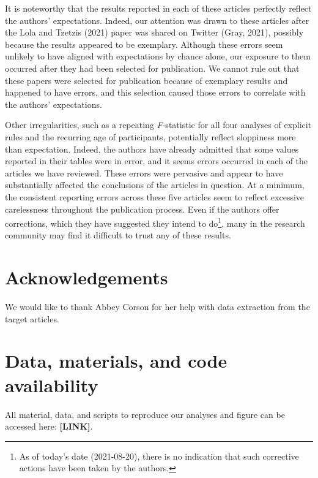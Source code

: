 \documentclass[
  english,
  man,floatsintext]{apa7}
\begin{document}
It is noteworthy that the results reported in each of these articles perfectly reflect the authors' expectations. Indeed, our attention was drawn to these articles after the Lola and Tzetzis (2021) paper was shared on Twitter (Gray, 2021), possibly because the results appeared to be exemplary. Although these errors seem unlikely to have aligned with expectations by chance alone, our exposure to them occurred after they had been selected for publication. We cannot rule out that these papers were selected for publication because of exemplary results and happened to have errors, and this selection caused those errors to correlate with the authors' expectations.

Other irregularities, such as a repeating \emph{F}-statistic for all four analyses of explicit rules and the recurring age of participants, potentially reflect sloppiness more than expectation. Indeed, the authors have already admitted that some values reported in their tables were in error, and it seems errors occurred in each of the articles we have reviewed. These errors were pervasive and appear to have substantially affected the conclusions of the articles in question. At a minimum, the consistent reporting errors across these five articles seem to reflect excessive carelessness throughout the publication process. Even if the authors offer corrections, which they have suggested they intend to do\footnote{As of today's date (2021-08-20), there is no indication that such corrective actions have been taken by the authors.}, many in the research community may find it difficult to trust any of these results.

\hypertarget{acknowledgements}{%
\section{Acknowledgements}\label{acknowledgements}}

We would like to thank Abbey Corson for her help with data extraction from the target articles.

\hypertarget{data-materials-and-code-availability}{%
\section{Data, materials, and code availability}\label{data-materials-and-code-availability}}

\label{sec:sharing} All material, data, and scripts to reproduce our analyses and figure can be accessed here: \textbf{{[}LINK{]}}.
\end{document}
